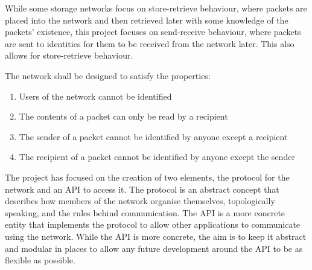 	While some storage networks focus on store-retrieve behaviour, where packets are placed into the network and then retrieved later with some knowledge of the packets' existence, this project focuses on send-receive behaviour, where packets are sent to identities for them to be received from the network later. This also allows for store-retrieve behaviour.
	
	The network shall be designed to satisfy the properties:
	\begin{enumerate}[topsep=-5pt,itemsep=-1ex,partopsep=2ex,parsep=1.5ex]
		\item Users of the network cannot be identified
		\item The contents of a packet can only be read by a recipient
		\item The sender of a packet cannot be identified by anyone except a recipient
		\item The recipient of a packet cannot be identified by anyone except the sender
	\end{enumerate} \vspace{0.5ex}
	
	The project has focused on the creation of two elements, the protocol for the network and an API to access it. The protocol is an abstract concept that describes how members of the network organise themselves, topologically speaking, and the rules behind communication. The API is a more concrete entity that implements the protocol to allow other applications to communicate using the network. While the API is more concrete, the aim is to keep it abstract and modular in places to allow any future development around the API to be as flexible as possible.